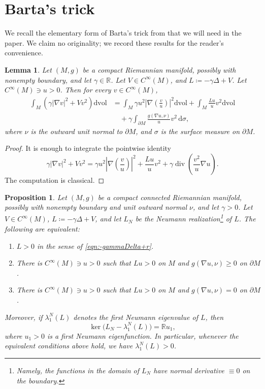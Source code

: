 \documentclass[11pt]{amsart}
\numberwithin{equation}{section}
\newtheorem{proposition}[theorem]{Proposition}
\newtheorem{lemma}[theorem]{Lemma}
\newcommand{\dd}{\,\mathrm d}
\newcommand{\dvol}{\mathrm{dvol}}
\let\geq\geqslant
\begin{document}
\section{Barta's trick}
We recall the elementary form of Barta's trick from \cite{Barta1937} that we will need in the paper. We claim no originality; we record these results for the reader's
convenience.
\begin{lemma}\label{lem:Barta}
    Let $(M,g)$ be a compact Riemannian manifold, possibly with nonempty boundary, and let  $\gamma\in\mathbb R$. Let $V\in C^\infty(M)$, and $L\coloneqq -\gamma\Delta+V$. Let $C^\infty(M)\ni u>0$. Then for every
$v\in C^\infty(M)$,
\begin{align}\label{eq:ground-state-transform-boundary}
\int_M\left(\gamma|\nabla v|^2+V v^2\right)\dvol
&=
\int_M\gamma u^2
\left|\nabla\left(\frac{v}{u}\right)\right|^2\dvol
+\int_M\frac{L u}{u}v^2\dvol \\
&\quad
+\gamma\int_{\partial M}
\frac{g(\nabla u,\nu)}{u}v^2\dd \sigma,
\end{align}
where $\nu$ is the outward unit normal to $\partial M$, and $\sigma$ is the surface measure on $\partial M$.
\end{lemma}
\begin{proof}
    It is enough to integrate the pointwise identity
    \begin{equation}\label{eq:pointwise-ground-state-transform}
\gamma|\nabla v|^2+V v^2
=
\gamma u^2\left|\nabla\left(\frac{v}{u}\right)\right|^2
+\frac{L u}{u}v^2
+\gamma\operatorname{div}\left(\frac{v^2}{u}\nabla u\right).
\end{equation}
The computation is classical.
\end{proof}
\begin{proposition}\label{cor:Barta}
    Let $(M,g)$ be a compact connected Riemannian manifold, possibly with nonempty boundary and unit outward normal $\nu$, and let  $\gamma>0$. Let $V\in C^\infty(M)$, $L\coloneqq -\gamma\Delta+V$, and let $L_N$ be the Neumann realization\footnote{Namely, the functions in the domain of $L_N$ have normal derivative $\equiv 0$ on the boundary.} of $L$. The following are equivalent:
    \begin{enumerate}
        \item $L>0$ in the sense of \eqref{eqn:-gammaDelta+r}.
        \item There is $C^\infty(M)\ni u>0$ such that $Lu>0$ on $M$ and $g(\nabla u,\nu)\geq 0$ on $\partial M$.
        \item There is $C^\infty(M)\ni u>0$ such that $Lu>0$ on $M$ and $g(\nabla u,\nu)= 0$ on $\partial M$.
    \end{enumerate}
    Moreover, if $\lambda_1^N(L)$ denotes the first Neumann eigenvalue
    of $L$, then
    \[
        \ker\bigl(L_N-\lambda_1^N(L)\bigr)=\mathbb R u_1,
    \]
    where $u_1>0$ is a first Neumann eigenfunction. In particular,
    whenever the equivalent conditions above hold, we have
    $\lambda_1^N(L)>0$.
\end{proposition}
\end{document}

